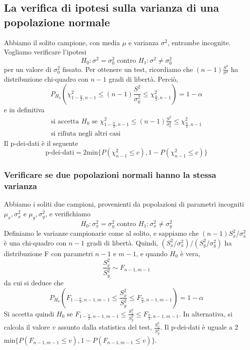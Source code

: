 \documentclass[11pt]{article}
\begin{document}
\subsection{La verifica di ipotesi sulla varianza di una popolazione normale}
Abbiamo il solito campione, con media $\mu$ e varianza $\sigma^2$, entrambe incognite. Vogliamo verificare l'ipotesi
\begin{displaymath}
    H_0:\sigma^2 = \sigma_0^2 \mbox{ contro }H_1: \sigma^2 \neq \sigma_0^2
\end{displaymath}
per un valore di $\sigma_0^2$ fissato. Per ottenere un test, ricordiamo che $(n-1)\frac{S^2}{\sigma^2}$ ha distribuzione chi-quadro con $n-1$ gradi di libertà. Perciò, 
\begin{displaymath}
    P_{H_0}\left(\chi^2_{1-\frac{\alpha}{2},n-1} \le  (n-1)\frac{S^2}{\sigma_0^2} \le       \chi^2_{\frac{\alpha}{2},n-1} \right) = 1-\alpha
\end{displaymath}
e in definitiva
\begin{gather*}
    \mbox{si accetta }H_0\mbox{ se }\chi^2_{1-\frac{\alpha}{2},n-1} \le  (n-1)\frac{S^2}{\sigma_0^2} \le       \chi^2_{\frac{\alpha}{2},n-1}\\ 
    \mbox{si rifiuta negli altri casi}
\end{gather*}
Il p-dei-dati è il seguente
\begin{displaymath}
    \mbox{p-dei-dati}=2\mbox{min}\{P(\chi_{n-1}^2 \le c), 1-P(\chi_{n-1}^2 \le c)\}
\end{displaymath}
\subsubsection{Verificare se due popolazioni normali hanno la stessa varianza}
Abbiamo i soliti due campioni, provenienti da popolazioni di parametri incogniti $\mu_x, \sigma^2_x$ e $\mu_y, \sigma^2_y$, e verifichiamo 
\begin{displaymath}
    H_0:\sigma^2_x=\sigma^2_y \mbox{ contro }H_1: \sigma_x^2 \neq \sigma_y^2
\end{displaymath}
Definiamo le varianze campionarie come al solito, e sappiamo che $(n-1)S_x^2/\sigma_x^2$ è una chi-quadro con $n-1$ gradi di libertà.
Quindi, $(S_x^2/\sigma_x^2)/(S_y^2/\sigma_y^2)$ ha distribuzione F con parametri $n-1$ e $m-1$, e quando $H_0$ è vera,
\begin{displaymath}
    \frac{S_x^2}{S_y^2}\sim F_{n-1,m-1}
\end{displaymath}
da cui si deduce che 
\begin{displaymath}
    P_{H_0}\left(F_{1-\frac{\alpha}{2},n-1,m-1} \le     \frac{S_x^2}{S_y^2} \le  F_{\frac{\alpha}{2},n-1,m-1}\right) = 1-\alpha
\end{displaymath}
Si accetta quindi $H_0$ se $F_{1-\frac{\alpha}{2},n-1,m-1} \le     \frac{S_x^2}{S_y^2} \le  F_{\frac{\alpha}{2},n-1,m-1}$. In alternativa, si calcola il valore $v$ assunto dalla statistica del test, $\frac{S_x^2}{S_y^2}$. Il p-dei-dati è uguale a $2$min$\{P(F_{n-1,m-1}\le v), 1-P(F_{n-1,m-1}\le v)\}$.
\end{document}
